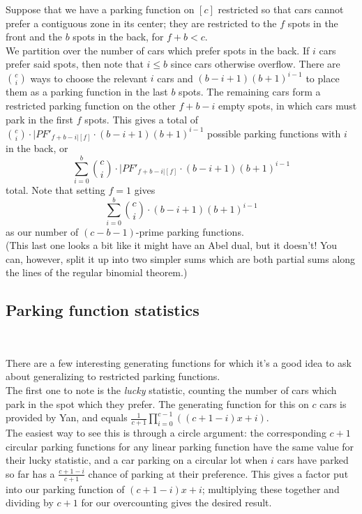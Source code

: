 Suppose that we have a parking function on $[c]$ restricted so that cars cannot prefer a contiguous zone in its center; they are restricted to the $f$ spots in the front and the $b$ spots in the back, for $f+b<c.$\\

We partition over the number of cars which prefer spots in the back. If $i$ cars prefer said spots, then note that $i\le b$ since cars otherwise overflow. There are $\binom{c}{i}$ ways to choose the relevant $i$ cars and $(b-i+1)(b+1)^{i-1}$ to place them as a parking function in the last $b$ spots. The remaining cars form a restricted parking function on the other $f+b-i$ empty spots, in which cars must park in the first $f$ spots. This gives a total of $\binom{c}{i}\cdot|PF'_{f+b-i|[f]}\cdot(b-i+1)(b+1)^{i-1}$ possible parking functions with $i$ in the back, or $$\sum_{i=0}^b \binom{c}{i}\cdot|PF'_{f+b-i|[f]}\cdot(b-i+1)(b+1)^{i-1}$$ total. Note that setting $f=1$ gives $$\sum_{i=0}^b \binom{c}{i}\cdot(b-i+1)(b+1)^{i-1}$$ as our number of $(c-b-1)$-prime parking functions.\\

(This last one looks a bit like it might have an Abel dual, but it doesn't! You can, however, split it up into two simpler sums which are both partial sums along the lines of the regular binomial theorem.)

\subsection*{Parking function statistics}~

There are a few interesting generating functions for which it's a good idea to ask about generalizing to restricted parking functions.\\

The first one to note is the \textit{lucky} statistic, counting the number of cars which park in the spot which they prefer. The generating function for this on $c$ cars is provided by Yan, and equals $\displaystyle\frac{1}{c+1}\prod_{i=0}^{c-1}((c+1-i)x+i).$\\

The easiest way to see this is through a circle argument: the corresponding $c+1$ circular parking functions for any linear parking function have the same value for their lucky statistic, and a car parking on a circular lot when $i$ cars have parked so far has a $\frac{c+1-i}{c+1}$ chance of parking at their preference. This gives a factor put into our parking function of $(c+1-i)x+i$; multiplying these together and dividing by $c+1$ for our overcounting gives the desired result.\\

